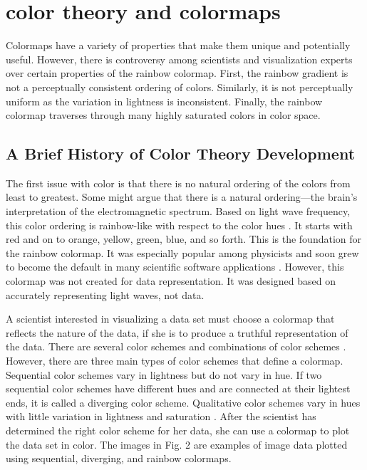 \documentclass[journal]{IEEEtran}
\begin{document}
\section{color theory and colormaps}

Colormaps have a variety of properties that make them unique and potentially useful. However, there is controversy among scientists and visualization experts over certain properties of the rainbow colormap. First, the rainbow gradient is not a perceptually consistent ordering of colors. Similarly, it is not perceptually uniform as the variation in lightness is inconsistent. Finally, the rainbow colormap traverses through many highly saturated colors in color space.
\par

\subsection{A Brief History of Color Theory Development}

The first issue with color is that there is no natural ordering of the colors
from least to greatest. Some might argue that there is a natural
ordering---the brain's interpretation of the electromagnetic spectrum.
Based on light wave frequency, this color ordering is rainbow-like with respect
to the color hues \cite{colormapping}. It starts with red and on to orange,
yellow, green, blue, and so forth. This is the foundation for the rainbow colormap.
It was especially popular among physicists and soon grew to become the default
in many scientific software applications \cite{rainbowstill,matlab}. However,
this colormap was not created for data representation. It was designed based
on accurately representing light waves, not data.
\par
A scientist interested in visualizing a data set must
choose a colormap that reflects the nature of the data, if she is to produce
a truthful representation of the data.
There are several color schemes and combinations of
color schemes \cite{colorguidelines}. However, there are
three main types of color schemes that define a colormap.
Sequential color schemes vary in lightness but do not
vary in hue. If two sequential color schemes have different hues and are
connected at their lightest ends, it is called a diverging color scheme. Qualitative color
schemes vary in hues with little variation in lightness
and saturation \cite{colormapping}. After the scientist has
determined the right color scheme for her data, she can
use a colormap to plot the data set in color.
The images in Fig. 2 are examples of image data plotted using
sequential, diverging, and rainbow colormaps.
\end{document}
